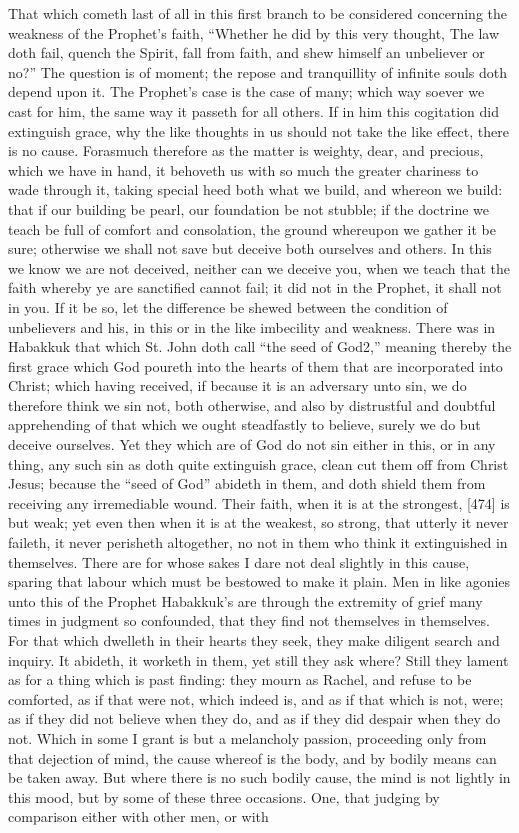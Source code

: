 That which cometh last of all in this first branch to be considered concerning the weakness of the Prophet’s faith, “Whether he did by this very thought, The law doth fail, quench the Spirit, fall from faith, and shew himself an unbeliever or no?” The question is of moment; the repose and tranquillity of infinite souls doth depend upon it. The Prophet’s case is the case of many; which way soever we cast for him, the same way it passeth for all others. If in him this cogitation did extinguish grace, why the like thoughts in us should not take the like effect, there is no cause. Forasmuch therefore as the matter is weighty, dear, and precious, which we have in hand, it behoveth us with so much the greater chariness to wade through it, taking special heed both what we build, and whereon we build: that if our building be pearl, our foundation be not stubble; if the doctrine we teach be full of comfort and consolation, the ground whereupon we gather it be sure; otherwise we shall not save but deceive both ourselves and others. In this we know we are not deceived, neither can we deceive you, when we teach that the faith whereby ye are sanctified cannot fail; it did not in the Prophet, it shall not in you. If it be so, let the difference be shewed between the condition of unbelievers and his, in this or in the like imbecility and weakness. There was in Habakkuk that which St. John doth call “the seed of God2,” meaning thereby the first grace which God poureth into the hearts of them that are incorporated into Christ; which having received, if because it is an adversary unto sin, we do therefore think we sin not, both otherwise, and also by distrustful and doubtful apprehending of that which we ought steadfastly to believe, surely we do but deceive ourselves. Yet they which are of God do not sin either in this, or in any thing, any such sin as doth quite extinguish grace, clean cut them off from Christ Jesus; because the “seed of God” abideth in them, and doth shield them from receiving any irremediable wound. Their faith, when it is at the strongest, [474] is but weak; yet even then when it is at the weakest, so strong, that utterly it never faileth, it never perisheth altogether, no not in them who think it extinguished in themselves. There are for whose sakes I dare not deal slightly in this cause, sparing that labour which must be bestowed to make it plain. Men in like agonies unto this of the Prophet Habakkuk’s are through the extremity of grief many times in judgment so confounded, that they find not themselves in themselves. For that which dwelleth in their hearts they seek, they make diligent search and inquiry. It abideth, it worketh in them, yet still they ask where? Still they lament as for a thing which is past finding: they mourn as Rachel, and refuse to be comforted, as if that were not, which indeed is, and as if that which is not, were; as if they did not believe when they do, and as if they did despair when they do not. Which in some I grant is but a melancholy passion, proceeding only from that dejection of mind, the cause whereof is the body, and by bodily means can be taken away. But where there is no such bodily cause, the mind is not lightly in this mood, but by some of these three occasions. One, that judging by comparison either with other men, or with 